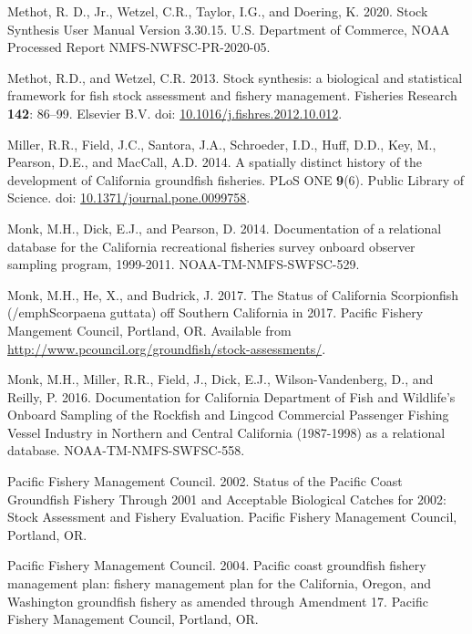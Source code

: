 \documentclass[
  english,
  a4paper,
]{article}
\newlength{\cslhangindent}
\newlength{\cslentryspacingunit} %
\newenvironment{CSLReferences}[2] %
 {%
  \setlength{\parindent}{0pt}
  \ifodd #1
  \let\oldpar\par
  \def\par{\hangindent=\cslhangindent\oldpar}
  \fi
  \setlength{\parskip}{#2\cslentryspacingunit}
 }%
 {}
\begin{document}
\begin{CSLReferences}{1}{0}
\leavevmode{}%
Methot, R. D., Jr., Wetzel, C.R., Taylor, I.G., and Doering, K. 2020. {Stock Synthesis User Manual Version 3.30.15}. U.S. Department of Commerce, NOAA Processed Report NMFS-NWFSC-PR-2020-05.

\leavevmode{}%
Methot, R.D., and Wetzel, C.R. 2013. {Stock synthesis: a biological and statistical framework for fish stock assessment and fishery management}. Fisheries Research \textbf{142}: 86--99. Elsevier B.V. doi: \href{https://doi.org/10.1016/j.fishres.2012.10.012}{10.1016/j.fishres.2012.10.012}.

\leavevmode{}%
Miller, R.R., Field, J.C., Santora, J.A., Schroeder, I.D., Huff, D.D., Key, M., Pearson, D.E., and MacCall, A.D. 2014. {A spatially distinct history of the development of California groundfish fisheries}. PLoS ONE \textbf{9}(6). Public Library of Science. doi: \href{https://doi.org/10.1371/journal.pone.0099758}{10.1371/journal.pone.0099758}.

\leavevmode{}%
Monk, M.H., Dick, E.J., and Pearson, D. 2014. {Documentation of a relational database for the California recreational fisheries survey onboard observer sampling program, 1999-2011}. NOAA-TM-NMFS-SWFSC-529.

\leavevmode{}%
Monk, M.H., He, X., and Budrick, J. 2017. {The Status of California Scorpionfish (/emph{Scorpaena guttata}) off Southern California in 2017}. Pacific Fishery Mangement Council, Portland, OR. Available from \url{http://www.pcouncil.org/groundfish/stock-assessments/}.

\leavevmode{}%
Monk, M.H., Miller, R.R., Field, J., Dick, E.J., Wilson-Vandenberg, D., and Reilly, P. 2016. {Documentation for California Department of Fish and Wildlife's Onboard Sampling of the Rockfish and Lingcod Commercial Passenger Fishing Vessel Industry in Northern and Central California (1987-1998) as a relational database}. NOAA-TM-NMFS-SWFSC-558.

\leavevmode{}%
Pacific Fishery Management Council. 2002. {Status of the Pacific Coast Groundfish Fishery Through 2001 and Acceptable Biological Catches for 2002: Stock Assessment and Fishery Evaluation.} Pacific Fishery Management Council, Portland, OR.

\leavevmode{}%
Pacific Fishery Management Council. 2004. {Pacific coast groundfish fishery management plan: fishery management plan for the California, Oregon, and Washington groundfish fishery as amended through Amendment 17}. Pacific Fishery Management Council, Portland, OR.


\end{CSLReferences}
\end{document}
